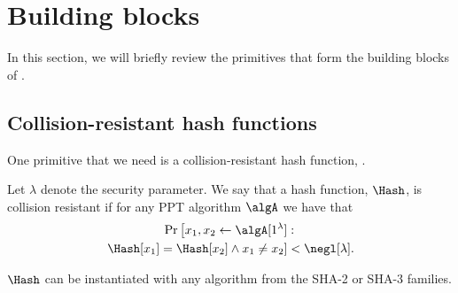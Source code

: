 \section{Building blocks}%
\label{Primitives}\label{BuildingBlocks}

In this section, we will briefly review the primitives that form the building blocks of \PRIVO.

\subsection{Collision-resistant hash functions}


One primitive that we need is a collision-resistant hash function, \Hash.

\begin{definition}
  Let \(\lambda\) denote the security parameter.
  We say that a hash function, \(\Hash\), is collision resistant if for any \ac{PPT} algorithm \(\algA\) we have that
  \begin{multline*}
    \Pr\left[ x_1, x_2\gets \algA[1^\lambda] :
      \right. \\ \left.
      \Hash[x_1] = \Hash[x_2] \land x_1\neq x_2 \right] < \negl[\lambda].
  \end{multline*}
\end{definition}

\(\Hash\) can be instantiated with any algorithm from the SHA-2 or SHA-3 families.





%







